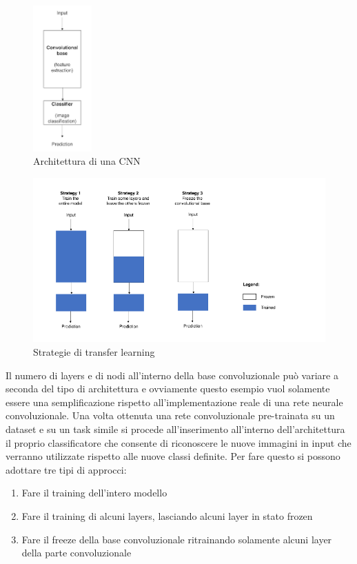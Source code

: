 \begin{figure}[H]
    \centering
    \includegraphics[width=0.2\textwidth]{./resources/CNNArchitecture.png}
    \caption{Architettura di una CNN} 
    \label{fig:cnn_architecture}
\end{figure}

\begin{figure}[H]
    \centering
    \includegraphics[width=1\textwidth]{./resources/transferLearningStrategies.png}
    \caption{Strategie di transfer learning} 
    \label{fig:transfer_learning_strategies}
\end{figure}

Il numero di layers e di nodi all'interno della base convoluzionale può variare a seconda del tipo di architettura e ovviamente questo esempio vuol solamente essere una semplificazione rispetto all'implementazione reale di una rete neurale convoluzionale.  
Una volta ottenuta una rete convoluzionale pre-trainata su un dataset e su un task simile si procede all'inserimento all'interno dell'architettura il proprio classificatore che consente di riconoscere le nuove immagini in input che verranno utilizzate rispetto alle nuove classi definite.  
Per fare questo si possono adottare tre tipi di approcci:
\begin{enumerate}
\item Fare il training dell'intero modello
\item Fare il training di alcuni layers, lasciando alcuni layer in stato frozen
\item Fare il freeze della base convoluzionale ritrainando solamente alcuni layer della parte convoluzionale
\end{enumerate}
  
